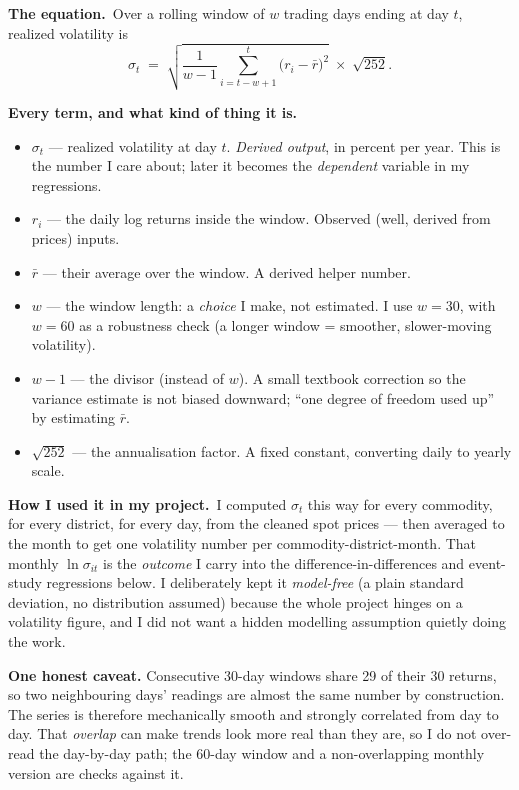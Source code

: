 \documentclass[11pt]{article}
\newcommand{\formula}{\smallskip\noindent\textbf{The equation.}\ }
\newcommand{\vars}{\smallskip\noindent\textbf{Every term, and what kind of thing it is.}\ }
\newcommand{\applied}{\smallskip\noindent\textbf{How I used it in my project.}\ }
\begin{document}
\formula Over a rolling window of $w$ trading days ending at day $t$, realized volatility is
\[
\sigma_t \;=\; \sqrt{\frac{1}{w-1}\sum_{i=t-w+1}^{t}\big(r_i - \bar r\big)^2}\;\times\;\sqrt{252}.
\]

\vars
\begin{itemize}
\item $\sigma_t$ --- realized volatility at day $t$. \emph{Derived output}, in percent per year.
This is the number I care about; later it becomes the \emph{dependent} variable in my regressions.
\item $r_i$ --- the daily log returns inside the window. Observed (well, derived from prices) inputs.
\item $\bar r$ --- their average over the window. A derived helper number.
\item $w$ --- the window length: a \emph{choice} I make, not estimated. I use $w=30$, with $w=60$
as a robustness check (a longer window = smoother, slower-moving volatility).
\item $w-1$ --- the divisor (instead of $w$). A small textbook correction so the variance estimate
is not biased downward; ``one degree of freedom used up'' by estimating $\bar r$.
\item $\sqrt{252}$ --- the annualisation factor. A fixed constant, converting daily to yearly scale.
\end{itemize}

\applied I computed $\sigma_t$ this way for every commodity, for every district, for every day,
from the cleaned spot prices --- then averaged to the month to get one volatility number per
commodity-district-month. That monthly $\ln\sigma_{it}$ is the \emph{outcome} I carry into the
difference-in-differences and event-study regressions below. I deliberately kept it
\emph{model-free} (a plain standard deviation, no distribution assumed) because the whole project
hinges on a volatility figure, and I did not want a hidden modelling assumption quietly doing the
work.

\smallskip\noindent\textbf{One honest caveat.} Consecutive 30-day windows share 29 of their 30
returns, so two neighbouring days' readings are almost the same number by construction. The series
is therefore mechanically smooth and strongly correlated from day to day. That \emph{overlap} can
make trends look more real than they are, so I do not over-read the day-by-day path; the 60-day
window and a non-overlapping monthly version are checks against it.

\end{document}
